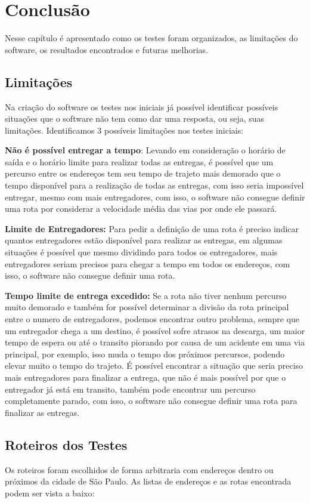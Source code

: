\chapter{Conclusão}
Nesse capítulo é apresentado como os testes foram organizados, as limitações do software, os resultados encontrados e futuras melhorias.

\section{Limitações}
Na criação do software os testes nos iniciais já possível identificar possíveis situações que o software não tem como dar uma resposta, ou seja, suas limitações.
Identificamos 3 possíveis limitações nos testes iniciais:  

\textbf{Não é possível entregar a tempo}: Levando em consideração o horário de saída e o horário limite para realizar todas as entregas, é possível que um percurso entre os endereços tem seu tempo de trajeto mais demorado que o tempo disponível para a realização de todas as entregas, com isso seria impossível entregar, mesmo com mais entregadores, com isso, o software não consegue definir uma rota por considerar a velocidade média das vias por onde ele passará.

\textbf{Limite de Entregadores:} Para pedir a definição de uma rota é preciso indicar quantos entregadores estão disponível para realizar as entregas, em algumas situações é possível que mesmo dividindo para todos os entregadores, mais entregadores seriam precisos para chegar a tempo em todos os endereços, com isso, o software não consegue definir uma rota.

\textbf{Tempo limite de entrega excedido:} Se a rota não tiver nenhum percurso muito demorado e também for possível determinar a divisão da rota principal entre o numero de entregadores, podemos encontrar outro problema, sempre que um entregador chega a um destino, é possível sofre atrasos na descarga, um maior tempo de espera ou até o transito piorando por causa de um acidente em uma via principal, por exemplo, isso muda o tempo dos próximos percursos, podendo elevar muito o tempo do trajeto.
É possível encontrar a situação que seria preciso mais entregadores para finalizar a entrega, que não é mais possível por que o entregador já está em transito, também pode encontrar um percurso completamente parado,  com isso, o software não consegue definir uma rota para finalizar as entregas.

\pagebreak
\section{Roteiros dos Testes}
Os roteiros foram escolhidos de forma arbitraria com endereços dentro ou próximos da cidade de São Paulo. As listas de endereços e as rotas encontrada podem ser vista a baixo:

